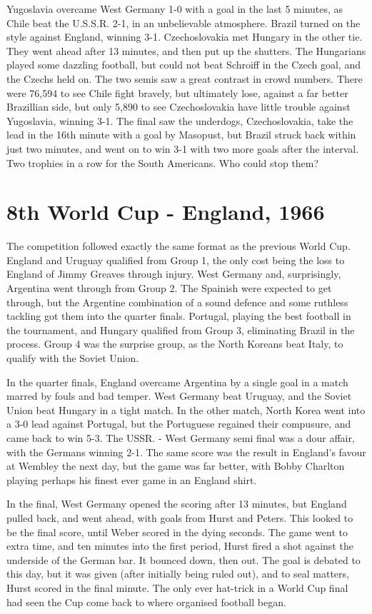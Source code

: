 Yugoslavia overcame West Germany 1-0 with a goal in the last 5 minutes, as 
Chile beat the U.S.S.R. 2-1, in an unbelievable atmosphere. Brazil turned on 
the style against England, winning 3-1. Czechoslovakia met Hungary in the other
tie. They went ahead after 13 minutes, and then put up the shutters. The 
Hungarians played some dazzling football, but could not beat Schroiff in the 
Czech goal, and the Czechs held on. The two semis saw a great contrast in crowd
numbers. There were 76,594 to see Chile fight bravely, but ultimately lose, 
against a far better Brazillian side, but only 5,890 to see Czechoslovakia 
have little trouble against Yugoslavia, winning 3-1. The final saw the 
underdogs, Czechoslovakia, take the lead in the 16th minute with a goal by 
Masopust, but Brazil struck back within just two minutes, and went on to win 
3-1 with two more goals after the interval. Two trophies in a row for the South
Americans. Who could stop them?
\section{8th World Cup - England, 1966}
The competition followed exactly the same format as the previous World Cup.
England and Uruguay qualified from Group 1, the only cost being the loss to 
England of Jimmy Greaves through injury. West Germany and, surprisingly, 
Argentina went through from Group 2. The Spainish were expected to get through,
but the Argentine combination of a sound defence and some ruthless tackling got
them into the quarter finals. Portugal, playing the best football in the 
tournament, and Hungary qualified from Group 3, eliminating Brazil in the 
process. Group 4 was the surprise group, as the North Koreans beat Italy, to 
qualify with the Soviet Union.

In the quarter finals, England overcame Argentina by a single goal in a match 
marred by fouls and bad temper. West Germany beat Uruguay, and the Soviet Union
beat Hungary in a tight match. In the other match, North Korea went into a 3-0
lead against Portugal, but the Portuguese regained their compusure, and came 
back to win 5-3. The USSR. - West Germany semi final was a dour affair, with
the Germans winning 2-1. The same score was the result in England's favour at 
Wembley the next day, but the game was far better, with Bobby Charlton playing 
perhaps his finest ever game in an England shirt.

In the final, West Germany opened the scoring after 13 minutes, but England 
pulled back, and went ahead, with goals from Hurst and Peters. This looked to 
be the final score, until Weber scored in the dying seconds. The game went to 
extra time, and ten minutes into the first period, Hurst fired a shot against 
the underside of the German bar. It bounced down, then out. The goal is debated
to this day, but it was given (after initially being ruled out), and to seal
matters, Hurst scored in the final minute. The only ever hat-trick in a World
Cup final had seen the Cup come back to where organised football began.
